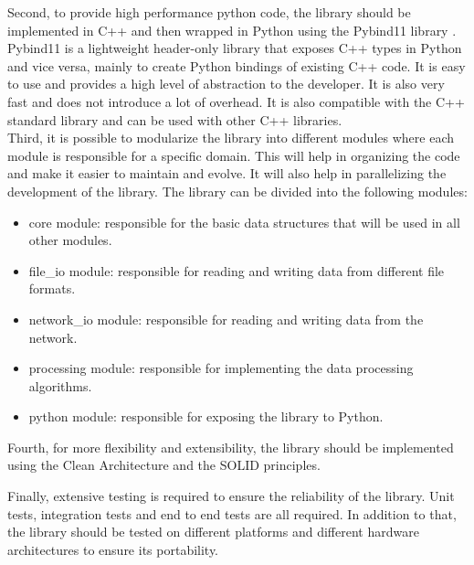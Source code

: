 \begin{spacing}{1.2}
    Second, to provide high performance python code, the library should be implemented in C++ and then wrapped in Python using the Pybind11 library \cite{pybind11}.
    Pybind11 is a lightweight header-only library that exposes C++ types in Python and vice versa, mainly to create Python bindings of existing C++ code.
    It is easy to use and provides a high level of abstraction to the developer. It is also very fast and does not introduce a lot of overhead.
    It is also compatible with the C++ standard library and can be used with other C++ libraries.\\

    Third, it is possible to modularize the library into different modules where each module is responsible for a specific domain.
    This will help in organizing the code and make it easier to maintain and evolve. It will also help in parallelizing the development of the library.
    The library can be divided into the following modules:
    \begin{itemize}
        \item core module: responsible for the basic data structures that will be used in all other modules.
        \item file\_io module: responsible for reading and writing data from different file formats.
        \item network\_io module: responsible for reading and writing data from the network.
        \item processing module: responsible for implementing the data processing algorithms.
        \item python module: responsible for exposing the library to Python.
    \end{itemize}

    Fourth, for more flexibility and extensibility, the library should be implemented using the Clean Architecture and the SOLID principles.

    Finally, extensive testing is required to ensure the reliability of the library. Unit tests, integration tests and end to end tests are all required.
    In addition to that, the library should be tested on different platforms and different hardware architectures to ensure its portability.
















\end{spacing}
